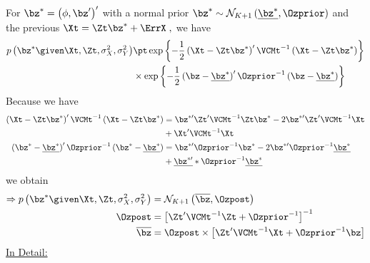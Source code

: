 For $\bz^*=\left(\phi,\bz^{\prime}\right)^{\prime}$ with a normal prior $\bz^*\sim\mathcal{N}_{K+1}\left(\underline{\bz^*}, \Ozprior\right)$ and the previous $\Xt=\Zt\bz^* + \ErrX\;,$ we have
\begin{align*}
p\left(\bz^*\given \Xt,\Zt,\sigma_X^2,\sigma_Y^2\right) 
& \pt
\exp\left\lbrace-\frac{1}{2}\left(\Xt-\Zt\bz^*\right)^{\prime}\VCMt^{-1}\left(\Xt-\Zt\bz^*\right)\right\rbrace\\
& \times 
\exp\left\lbrace-\frac{1}{2}\left(\bz-\underline{\bz^*}\right)^{\prime}\Ozprior^{-1}\left(\bz-\underline{\bz^*}\right)\right\rbrace\\
\end{align*}
Because we have
\begin{align*}
\left(\Xt-\Zt\bz^*\right)^{\prime}\VCMt^{-1}\left(\Xt-\Zt\bz^*\right)
& =
\bz^{*\prime}\Zt^{\prime}\VCMt^{-1}\Zt\bz^{*}-2\bz^{*\prime}\Zt^{\prime}\VCMt^{-1}\Xt\\
& + \Xt^{\prime}\VCMt^{-1}\Xt
\\
\left(\bz^*-\underline{\bz^*}\right)^{\prime}\Ozprior^{-1}\left(\bz^*-\underline{\bz^*}\right) 
& = 
\bz^{*\prime}\Ozprior^{-1}\bz^*
-2\bz^{*\prime}\Ozprior^{-1}\underline{\bz^*}\\
& +
\underline{\bz^{*\prime}}*\Ozprior^{-1}\underline{\bz^*}
\end{align*}
we obtain
\begin{align*}
\Rightarrow 
p\left(\bz^*\given \Xt,\Zt,\sigma_X^2,\sigma_Y^2\right)
&=
\mathcal{N}_{K+1}\left(\overline{\bz},\Ozpost\right)\;\\
\Ozpost
& =
\left[\Zt^{\prime}\VCMt^{-1}\Zt+\Ozprior^{-1}\right]^{-1} \\
\overline{\bz}
& =
\Ozpost\times\left[\Zt^{\prime}\VCMt^{-1}\Xt+\Ozprior^{-1}\bz\right]
\end{align*}
%
%
%
%
%
\clearpage
\underline{In Detail:}